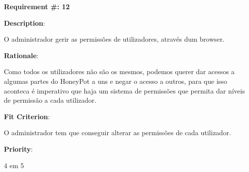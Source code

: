 \pagebreak






\begin{minipage}{0.55\textwidth}
\begin{flushleft}\textbf{Requirement \#: 12}\end{flushleft}
\end{minipage}
\begin{minipage}{0.4\textwidth}
\end{minipage}

\begin{description}
\item \textbf{Description}:

O administrador gerir as permissões de utilizadores, através dum browser.


\item \textbf{Rationale}:

Como todos os utilizadores não são os mesmos, podemos querer dar acessos a algumas partes do HoneyPot a uns e negar o acesso a outros, para que isso aconteca é imperativo que haja um sistema de permissões que permita dar níveis de permissão a cada utilizador.

\item \textbf{Fit Criterion}:

O administrador tem que conseguir alterar as permissões de cada utilizador.

\item \textbf{Priority}:

4 em 5

\end{description}

\pagebreak



